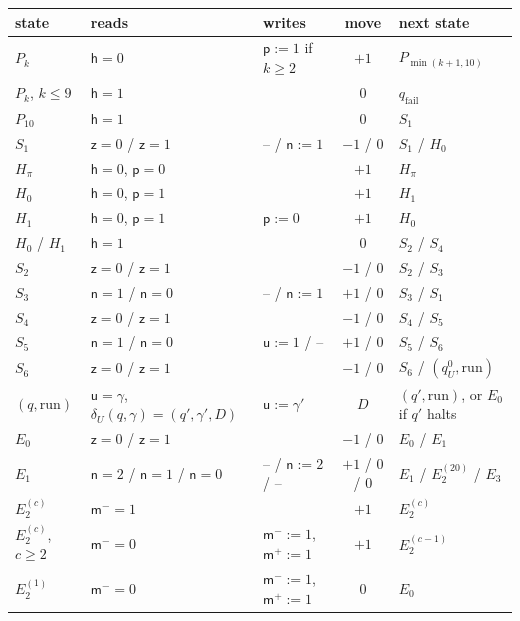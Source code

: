 \begin{table}[ht]
\centering
\small
\begin{tabularx}{\textwidth}{@{}l>{\raggedright\arraybackslash}X>{\raggedright\arraybackslash}p{2.6cm}c>{\raggedright\arraybackslash}p{2.5cm}@{}}
\toprule
state & reads & writes & move & next state\\
\midrule
$P_k$ & $\mathsf h=0$ & $\mathsf p:=1$ if $k\ge2$ & $+1$ & $P_{\min(k+1,10)}$\\
$P_k$, $k\le9$ & $\mathsf h=1$ & & $0$ & $q_{\mathrm{fail}}$\\
$P_{10}$ & $\mathsf h=1$ & & $0$ & $S_1$\\
$S_1$ & $\mathsf z=0$ / $\mathsf z=1$ & -- / $\mathsf n:=1$ & $-1$ / $0$ & $S_1$ / $H_0$\\
$H_\pi$ & $\mathsf h=0$, $\mathsf p=0$ & & $+1$ & $H_\pi$\\
$H_0$ & $\mathsf h=0$, $\mathsf p=1$ & & $+1$ & $H_1$\\
$H_1$ & $\mathsf h=0$, $\mathsf p=1$ & $\mathsf p:=0$ & $+1$ & $H_0$\\
$H_0$ / $H_1$ & $\mathsf h=1$ & & $0$ & $S_2$ / $S_4$\\
$S_2$ & $\mathsf z=0$ / $\mathsf z=1$ & & $-1$ / $0$ & $S_2$ / $S_3$\\
$S_3$ & $\mathsf n=1$ / $\mathsf n=0$ & -- / $\mathsf n:=1$ & $+1$ / $0$ & $S_3$ / $S_1$\\
$S_4$ & $\mathsf z=0$ / $\mathsf z=1$ & & $-1$ / $0$ & $S_4$ / $S_5$\\
$S_5$ & $\mathsf n=1$ / $\mathsf n=0$ & $\mathsf u:=1$ / -- & $+1$ / $0$ & $S_5$ / $S_6$\\
$S_6$ & $\mathsf z=0$ / $\mathsf z=1$ & & $-1$ / $0$ & $S_6$ / $(q^0_U,\mathrm{run})$\\
$(q,\mathrm{run})$ & $\mathsf u=\gamma$, $\delta_U(q,\gamma)=(q',\gamma',D)$ & $\mathsf u:=\gamma'$ & $D$ & $(q',\mathrm{run})$, or $E_0$ if $q'$ halts\\
$E_0$ & $\mathsf z=0$ / $\mathsf z=1$ & & $-1$ / $0$ & $E_0$ / $E_1$\\
$E_1$ & $\mathsf n=2$ / $\mathsf n=1$ / $\mathsf n=0$ & -- / $\mathsf n:=2$ / -- & $+1$ / $0$ / $0$ & $E_1$ / $E_2^{(20)}$ / $E_3$\\
$E_2^{(c)}$ & $\mathsf m^-=1$ & & $+1$ & $E_2^{(c)}$\\
$E_2^{(c)}$, $c\ge2$ & $\mathsf m^-=0$ & $\mathsf m^-:=1$, $\mathsf m^+:=1$ & $+1$ & $E_2^{(c-1)}$\\
$E_2^{(1)}$ & $\mathsf m^-=0$ & $\mathsf m^-:=1$, $\mathsf m^+:=1$ & $0$ & $E_0$\\

\end{tabularx}
\end{table}
